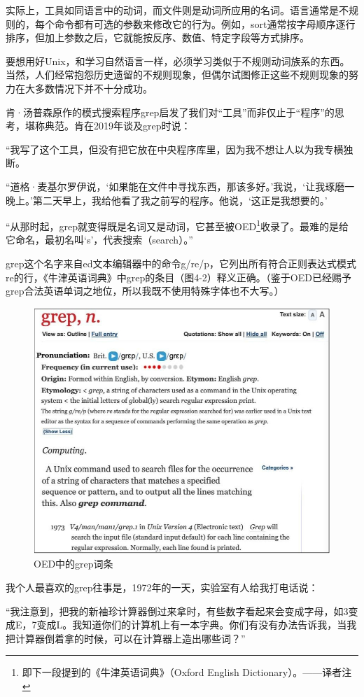 \documentclass[a4paper,12pt,UTF8,twoside]{ctexbook}
\begin{document}
实际上，工具如同语言中的动词，而文件则是动词所应用的名词。语言通常是不规则的，每个命令都有可选的参数来修改它的行为。例如，sort通常按字母顺序逐行排序，但加上参数之后，它就能按反序、数值、特定字段等方式排序。

要想用好Unix，和学习自然语言一样，必须学习类似于不规则动词族系的东西。当然，人们经常抱怨历史遗留的不规则现象，但偶尔试图修正这些不规则现象的努力在大多数情况下并不十分成功。

肯·汤普森原作的模式搜索程序grep启发了我们对“工具”而非仅止于“程序”的思考，堪称典范。肯在2019年谈及grep时说：

“我写了这个工具，但没有把它放在中央程序库里，因为我不想让人以为我专横独断。

“道格·麦基尔罗伊说，‘如果能在文件中寻找东西，那该多好。’我说，‘让我琢磨一晚上。’第二天早上，我给他看了我之前写的程序。他说，‘这正是我想要的。’

“从那时起，grep就变得既是名词又是动词，它甚至被OED\footnote{即下一段提到的《牛津英语词典》（Oxford English Dictionary）。——译者注}收录了。最难的是给它命名，最初名叫‘s’，代表搜索（search）。”

grep这个名字来自ed文本编辑器中的命令g/re/p，它列出所有符合正则表达式模式re的行，《牛津英语词典》中grep的条目（图4-2）释义正确。（鉴于OED已经赐予grep合法英语单词之地位，所以我既不使用特殊字体也不大写。）

\begin{figure}[htbp]
	\centering
	\includegraphics[width=0.7\linewidth]{35}
	\caption{OED中的grep词条}
	\label{fig:1}
\end{figure}

我个人最喜欢的grep往事是，1972年的一天，实验室有人给我打电话说：

“我注意到，把我的新袖珍计算器倒过来拿时，有些数字看起来会变成字母，如3变成E，7变成L。我知道你们的计算机上有一本字典。你们有没有办法告诉我，当我把计算器倒着拿的时候，可以在计算器上造出哪些词？”
\end{document}
